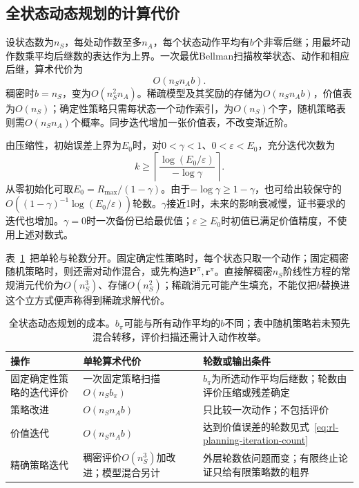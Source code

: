 \subsection{全状态动态规划的计算代价}
\label{sec:rl-planning-dp-complexity}

设状态数为$n_S$，每处动作数至多$n_A$，每个状态动作平均有$b$个非零后继；用最坏动作数乘平均后继数的表达作为上界。一次最优Bellman扫描枚举状态、动作和相应后继，算术代价为
\begin{equation}
 O(n_Sn_Ab).
 \label{eq:rl-planning-sweep-cost}
\end{equation}
稠密时$b=n_S$，变为$O(n_S^2n_A)$。稀疏模型及其奖励的存储为$O(n_Sn_Ab)$，价值表为$O(n_S)$；确定性策略只需每状态一个动作索引，为$O(n_S)$个字，随机策略表则需$O(n_Sn_A)$个概率。同步迭代增加一张价值表，不改变渐近阶。

由压缩性，初始误差上界为$E_0$时，对$0<\gamma<1$、$0<\varepsilon<E_0$，充分迭代次数为
\begin{equation}
 k\geq\left\lceil\frac{\log(E_0/\varepsilon)}{-\log\gamma}\right\rceil.
 \label{eq:rl-planning-iteration-count}
\end{equation}
从零初始化可取$E_0=R_{\max}/(1-\gamma)$。由于$-\log\gamma\geq1-\gamma$，也可给出较保守的
$O((1-\gamma)^{-1}\log(E_0/\varepsilon))$轮数。$\gamma$接近1时，未来的影响衰减慢，证书要求的迭代也增加。$\gamma=0$时一次备份已给最优值；$\varepsilon\geq E_0$时初值已满足价值精度，不使用上述对数式。

表~\ref{tab:rl-planning-dp-costs}~把单轮与轮数分开。固定确定性策略时，每个状态只取一个动作；固定稠密随机策略时，则还需对动作混合，或先构造$\bm P^\pi,\bm r^\pi$。直接解稠密$n_S$阶线性方程的常规消元代价为$O(n_S^3)$、存储$O(n_S^2)$；稀疏消元可能产生填充，不能仅把$b$替换进这个立方式便声称得到稀疏求解代价。

\begin{table}[htbp]
 \centering
 \small
 \begin{tabularx}{\linewidth}{@{}l>{\raggedright\arraybackslash}X>{\raggedright\arraybackslash}X@{}}
  \toprule
  操作 & 单轮算术代价 & 轮数或输出条件\\
  \midrule
  固定确定性策略的迭代评价 & 一次固定策略扫描$O(n_Sb_\pi)$ & $b_\pi$为所选动作平均后继数；轮数由评价压缩或残差确定\\
  策略改进 & $O(n_Sn_Ab)$ & 只比较一次动作；不包括评价\\
  价值迭代 & $O(n_Sn_Ab)$ & 达到价值误差的轮数见式~\eqref{eq:rl-planning-iteration-count}\\
  精确策略迭代 & 稠密评价$O(n_S^3)$加改进；模型混合另计 & 外层轮数依问题而变；有限终止论证只给有限策略数的粗界\\
  \bottomrule
 \end{tabularx}
 \caption{全状态动态规划的成本。$b_\pi$可能与所有动作平均的$b$不同；表中随机策略若未预先混合转移，评价扫描还需计入动作枚举。}
 \label{tab:rl-planning-dp-costs}
\end{table}

